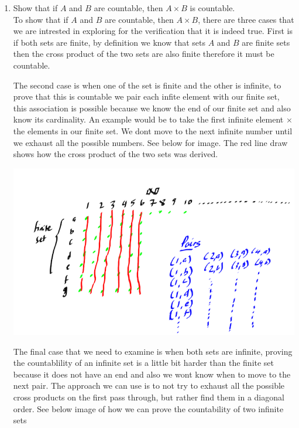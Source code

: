 \documentclass[12pt]{article}
\begin{document}
\begin{enumerate}
\item Show that if $A$ and $B$ are countable, then $A \times B$ is countable.\\

    To show that if $A$ and $B$ are countable, then $A \times B$, there are three cases that we are intrested in exploring for the verification that it is indeed true. First is if both sets are finite, by definition we know that sets $A$ and $B$ are finite sets then the cross product of the two sets are also finite therefore it must be countable. 

    The second case is when one of the set is finite and the other is infinite, to prove that this is countable we pair each infite element with our finite set, this association is possible because we know the end of our finite set and also know its cardinality. An example would be to take the first infinite element $\times$ the elements in our finite set. We dont move to the next infinite number until we exhaust all the possible numbers. See below for image. The red line draw shows how the cross product of the two sets was derived.
    \begin{center}
    \includegraphics[scale=0.55]{infinity.png}
    \end{center}
    The final case that we need to examine is when both sets are infinite, proving the countablility of an infinite set is a little bit harder than the finite set because it does not have an end and also we wont know when to move to the next pair. The approach we can use is to not try to exhaust all the possible cross products on the first pass through, but rather find them in a diagonal order. See below image of how we can prove the countability of two infinite sets
    \begin{center}

\end{center}
\end{enumerate}
\end{document}
